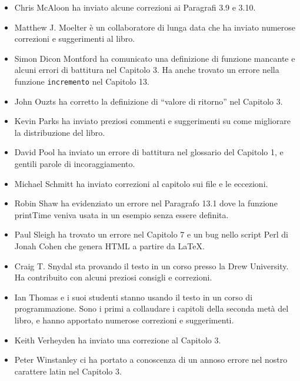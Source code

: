 \documentclass[10pt]{book}
\begin{document}
\begin{itemize}
\item Chris McAloon ha inviato alcune correzioni ai Paragrafi 3.9 e
3.10.

\item Matthew J. Moelter è un collaboratore di lunga data che ha inviato numerose correzioni e suggerimenti al libro.  

\item Simon Dicon Montford ha comunicato una definizione di funzione mancante e alcuni errori di battitura nel Capitolo 3. Ha anche trovato un errore nella funzione {\tt incremento} nel Capitolo 13.

\item John Ouzts ha corretto la definizione di ``valore di ritorno'' nel Capitolo 3.

\item Kevin Parks ha inviato preziosi commenti e suggerimenti su come migliorare la distribuzione del libro.

\item David Pool ha inviato un errore di battitura nel glossario del Capitolo 1, e gentili parole di incoraggiamento.

\item Michael Schmitt ha inviato correzioni al capitolo sui file e le eccezioni.

\item Robin Shaw ha evidenziato un errore nel Paragrafo 13.1 dove la funzione printTime veniva usata in un esempio senza essere definita.

\item Paul Sleigh ha trovato un errore nel Capitolo 7 e un bug nello script Perl di Jonah Cohen che genera HTML a partire da LaTeX.

\item Craig T. Snydal sta provando il testo in un corso presso la Drew
University. Ha contribuito con alcuni preziosi consigli e correzioni.

\item Ian Thomas e i suoi studenti stanno usando il testo in un corso di programmazione. Sono i primi a collaudare i capitoli della seconda metà del libro, e hanno apportato numerose correzioni e suggerimenti.

\item Keith Verheyden ha inviato una correzione al Capitolo 3.

\item Peter Winstanley ci ha portato a conoscenza di un annoso errore nel nostro carattere latin nel Capitolo 3.


\end{itemize}
\end{document}
